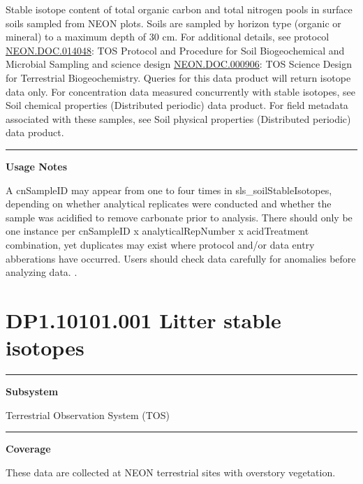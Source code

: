 \documentclass[]{article}
\begin{document}
Stable isotope content of total organic carbon and total nitrogen pools
in surface soils sampled from NEON plots. Soils are sampled by horizon
type (organic or mineral) to a maximum depth of 30 cm. For additional
details, see protocol
\href{http://data.neonscience.org/api/v0/documents/NEON.DOC.014048vJ}{NEON.DOC.014048}:
TOS Protocol and Procedure for Soil Biogeochemical and Microbial
Sampling and science design
\href{http://data.neonscience.org/api/v0/documents/NEON.DOC.000906vA}{NEON.DOC.000906}:
TOS Science Design for Terrestrial Biogeochemistry. Queries for this
data product will return isotope data only. For concentration data
measured concurrently with stable isotopes, see Soil chemical properties
(Distributed periodic) data product. For field metadata associated with
these samples, see Soil physical properties (Distributed periodic) data
product.

\begin{center}\rule{0.5\linewidth}{\linethickness}\end{center}

\textbf{Usage Notes}

A cnSampleID may appear from one to four times in
sls\_soilStableIsotopes, depending on whether analytical replicates were
conducted and whether the sample was acidified to remove carbonate prior
to analysis. There should only be one instance per cnSampleID x
analyticalRepNumber x acidTreatment combination, yet duplicates may
exist where protocol and/or data entry abberations have occurred. Users
should check data carefully for anomalies before analyzing data.
\newpage
.

\section{DP1.10101.001 Litter stable
isotopes}\label{dp1.10101.001-litter-stable-isotopes}

\begin{center}\rule{0.5\linewidth}{\linethickness}\end{center}

\textbf{Subsystem}

Terrestrial Observation System (TOS)

\begin{center}\rule{0.5\linewidth}{\linethickness}\end{center}

\textbf{Coverage}

These data are collected at NEON terrestrial sites with overstory
vegetation.
\end{document}
